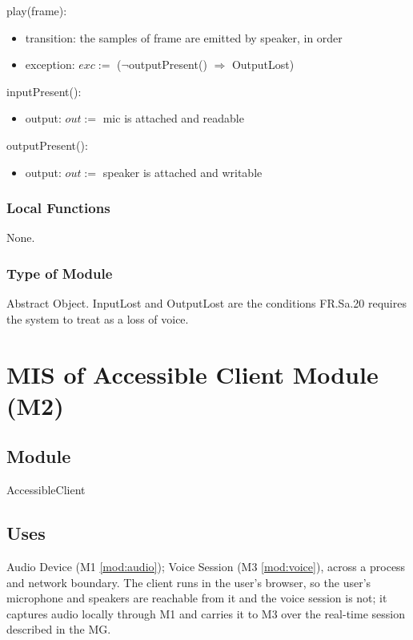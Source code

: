 \documentclass[12pt, titlepage]{article}
\begin{document}
\noindent play(frame):
\begin{itemize}
\item transition: the samples of frame are emitted by speaker, in order
\item exception: $exc :=$ ($\lnot$outputPresent() $\Rightarrow$ OutputLost)
\end{itemize}

\noindent inputPresent():
\begin{itemize}
\item output: $out :=$ mic is attached and readable
\end{itemize}

\noindent outputPresent():
\begin{itemize}
\item output: $out :=$ speaker is attached and writable
\end{itemize}

\subsubsection{Local Functions}

None.

\subsubsection{Type of Module}

Abstract Object. InputLost and OutputLost are the conditions FR.Sa.20 requires
the system to treat as a loss of voice.

\newpage

\section{MIS of Accessible Client Module (M2)} \label{mod:client}

\subsection{Module}

AccessibleClient

\subsection{Uses}

Audio Device (M1 \ref{mod:audio}); Voice Session (M3 \ref{mod:voice}), across a
process and network boundary. The client runs in the user's browser, so the
user's microphone and speakers are reachable from it and the voice session is
not; it captures audio locally through M1 and carries it to M3 over the
real-time session described in the MG.
\end{document}
